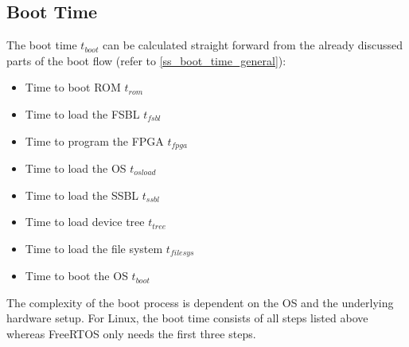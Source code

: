 \subsection{Boot Time}\label{ss_boot_time_math}
The boot time $ t_{boot} $ can be calculated straight forward from the already discussed parts of the boot flow (refer to \ref{ss_boot_time_general}):
\begin{itemize}
	\item Time to boot \ac{ROM} $ t_{rom} $
	\item Time to load the \ac{FSBL} $ t_{fsbl} $
	\item Time to program the \ac{FPGA} $ t_{fpga} $
	\item Time to load the \ac{OS} $ t_{osload} $
	\item Time to load the \ac{SSBL} $ t_{ssbl} $ 
	\item Time to load device tree $t_{tree} $
	\item Time to load the file system $ t_{filesys}$
	\item Time to boot the \ac{OS} $ t_{boot} $
\end{itemize} 
The complexity of the boot process is dependent on the \ac{OS} and the underlying hardware setup.
For Linux, the boot time consists of all steps listed above whereas FreeRTOS only needs the first three steps. 
  
